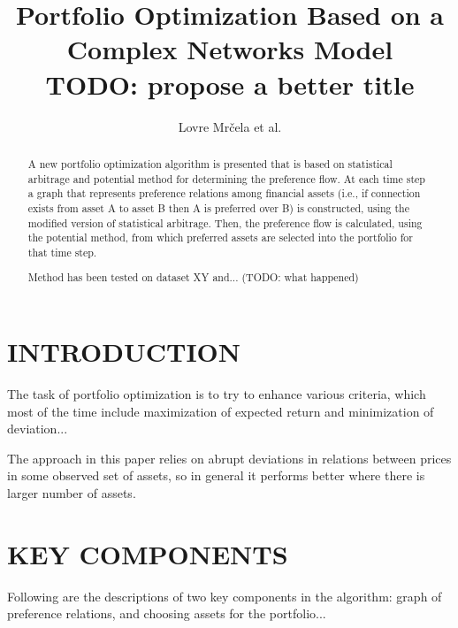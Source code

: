 \documentclass[letterpaper, 10 pt, conference]{ieeeconf}
\title{\LARGE \bf Portfolio Optimization Based on a Complex Networks Model\\
  \normalsize TODO: propose a better title}
\author{Lovre Mr\v{c}ela et al.}
\begin{document}
  \maketitle
  \thispagestyle{empty}
  \pagestyle{empty}
    
  \begin{abstract}
    
  A new portfolio optimization algorithm is presented that is based on statistical arbitrage and potential method for determining the preference flow.
  At each time step a graph that represents preference relations among financial assets (i.e., if connection exists from asset A to asset B then A is preferred over B) is constructed, using the modified version of statistical arbitrage.
  Then, the preference flow is calculated, using the potential method\cite{caklovic}, from which preferred assets are selected into the portfolio for that time step.
  
  Method has been tested on dataset XY and... (TODO: what happened)
  
  \end{abstract}
  
  \section{INTRODUCTION}
  
  The task of portfolio optimization is to try to enhance various criteria, which most of the time include maximization of expected return and minimization of deviation...
  
  The approach in this paper relies on abrupt deviations in relations between prices in some observed set of assets, so in general it performs better where there is larger number of assets.
  
  
  
  \section{KEY COMPONENTS}
  
  Following are the descriptions of two key components in the algorithm: graph of preference relations, and choosing assets for the portfolio...
  
\end{document}
